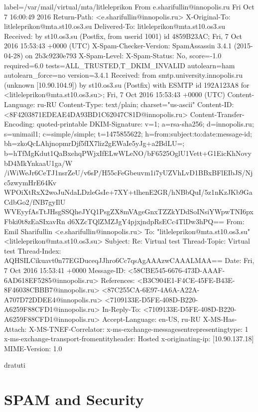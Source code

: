 \documentclass[a4paper,11pt]{article}
\begin{document}
\begin{bashcode*}{label=/var/mail/virtual/mta/litleleprikon}
From e.sharifullin@innopolis.ru  Fri Oct  7 16:00:49 2016
Return-Path: <e.sharifullin@innopolis.ru>
X-Original-To: litleleprikon@mta.st10.os3.su
Delivered-To: litleleprikon@mta.st10.os3.su
Received: by st10.os3.su (Postfix, from userid 1001)
  id 4859B23AC; Fri,  7 Oct 2016 15:53:43 +0000 (UTC)
X-Spam-Checker-Version: SpamAssassin 3.4.1 (2015-04-28) on 2b3c9230e793
X-Spam-Level: 
X-Spam-Status: No, score=-1.0 required=6.0 tests=ALL_TRUSTED,T_DKIM_INVALID
  autolearn=ham autolearn_force=no version=3.4.1
Received: from smtp.university.innopolis.ru (unknown [10.90.104.9])
  by st10.os3.su (Postfix) with ESMTP id 192A123A8
  for <litleleprikon@mta.st10.os3.su>; Fri,  7 Oct 2016 15:53:43 +0000 (UTC)
Content-Language: ru-RU
Content-Type: text/plain; charset="us-ascii"
Content-ID: <8F4203871EDEAE4DA93BD1C62047C81D@innopolis.ru>
Content-Transfer-Encoding: quoted-printable
DKIM-Signature: v=1; a=rsa-sha256; d=innopolis.ru; s=unimail1;
  c=simple/simple; t=1475855622; h=from:subject:to:date:message-id;
  bh=zkoQcLAhjnopmrDjf5fIX7liz2gEWaIe5yJg+a2BdLU=;
  b=hTfMgKdut1QaBxehqPWjxIfELwWLeNO/bF6525OglU1Vett+G1EicKhNovybD4MkYnkaaU1ga/W
  /iWiWeJr6CeTJ1nsrZeU/v6sP/H55cFeGbeuvm1i7yUZVhLvD1BBxBFlEIbJS/Njc5zwymHrE64Kv
  WPOiXtRxX2woJuNdaLDzleGsIe+7XY+tlhenE2GR/hNBbQuI/5z1nKzJKb9GaCdbGo2/fNB7gyIlU
  WVEyyfAsTtJHsgSSQheJYQ1PsgZX8mVAgeGnxTZZkYDdSoINsiYWpwTNI6pxFbki0t8zEaSIxavRn
  d6XZcTQlZMZJgY4pjxjndpRsECc4TlDw3hPQ==
From: Emil Sharifullin <e.sharifullin@innopolis.ru>
To: "litleleprikon@mta.st10.os3.su" <litleleprikon@mta.st10.os3.su>
Subject: Re: Virtual test
Thread-Topic: Virtual test
Thread-Index: AQHSILCikuavt0n77EGDuceqJJhro6Cc7qsAgAAAzwCAAALMAA==
Date: Fri, 7 Oct 2016 15:53:41 +0000
Message-ID: <58CBE545-6676-473D-AAAF-6AD618EF5285@innopolis.ru>
References: <B3C904E1-F4CE-45FE-B43E-8F46038CBBB7@innopolis.ru>
 <87C255CA-6E97-4A6A-A22A-A707D72DDEE4@innopolis.ru>
 <7109133E-D5FE-408D-B220-A6259F88CFD1@innopolis.ru>
In-Reply-To: <7109133E-D5FE-408D-B220-A6259F88CFD1@innopolis.ru>
Accept-Language: en-US, ru-RU
X-MS-Has-Attach:
X-MS-TNEF-Correlator:
x-ms-exchange-messagesentrepresentingtype: 1
x-ms-exchange-transport-fromentityheader: Hosted
x-originating-ip: [10.90.137.18]
MIME-Version: 1.0

dratuti
\end{bashcode*}

\section{SPAM and Security}
\addtocounter{subsection}{4}
\end{document}
